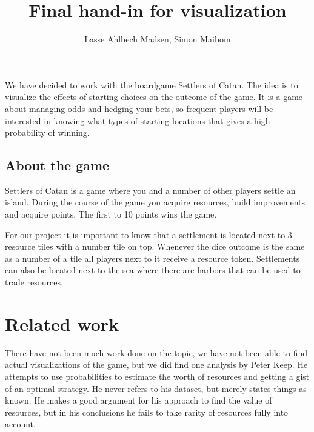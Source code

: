 \documentclass[journal]{vgtc}                %
\title{Final hand-in for visualization}
\author{Lasse Ahlbech Madsen, Simon Maibom}
\begin{document}


\maketitle

We have decided to work with the boardgame Settlers of Catan. The idea is to
visualize the effects of starting choices on the outcome of the game. It is a
game about managing odds and hedging your bets, so frequent players will be
interested in knowing what types of starting locations that gives a high
probability of winning.

\subsection{About the game}

Settlers of Catan is a game where you and a number of other players settle
an island. During the course of the game you acquire resources, build
improvements and acquire points. The first to 10 points wins the game.

For our project it is important to know that a settlement is located next
to 3 resource tiles with a number tile on top. Whenever the dice outcome is
the same as a number of a tile all players next to it receive a resource
token. Settlements can also be located next to the sea where there are harbors
that can be used to trade resources.

\section{Related work}

There have not been much work done on the topic, we have not been able to
find actual visualizations of the game, but we did find one analysis by Peter
Keep\cite{peter}. He attempts to use probabilities to estimate the worth of
resources and getting a gist of an optimal strategy. He never refers to his
dataset, but merely states things as known. He makes a good argument for his
approach to find the value of resources, but in his conclusions he fails to
take rarity of resources fully into account.
\end{document}
